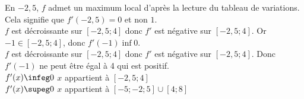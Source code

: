 \documentclass[a4paper, 11pt, oneside]{memoir}
\begin{document}
\begin{questions}
\exercice 
\question 
\subpart En $-2,5$, $f$ admet un maximum local d'après la lecture du tableau de variations. Cela signifie que $f'(-2,5) = 0$ et non $1$.\\
\subpart $f$ est décroissante sur $[-2,5;4]$ donc $f'$ est négative sur $[-2,5;4]$. Or $-1\in[-2,5;4]$, donc $f'(-1) \inf 0$.\\
\subpart $f$ est décroissante sur $[-2,5;4]$ donc $f'$ est négative sur $[-2,5;4]$. Donc $f'(-1)$ ne peut être égal à 4 qui est positif.\\
\question 
\subpart $f'(x) \infeg 0$ \ssi $x$ appartient à $[-2,5;4]$\\
\subpart $f'(x) \supeg 0$ \ssi $x$ appartient à $[-5;-2;5] \cup [4;8]$\\

\end{questions}
\end{document}
